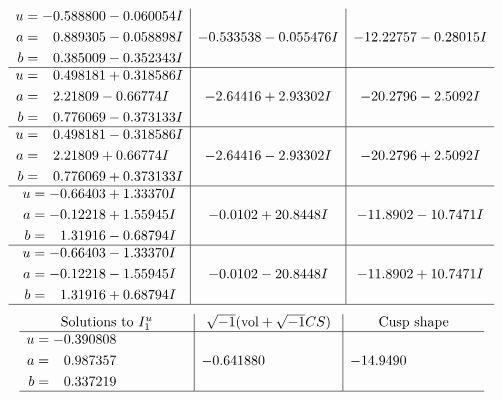 \documentclass[1p]{elsarticle_modified}
\theoremstyle{definition}
\newcommand{\I}{\sqrt{-1}}
\begin{document}
$$\begin{array}{c|c|c}
\begin{aligned}
u &= -0.588800 - 0.060054 I \\
a &= \phantom{-}0.889305 - 0.058898 I \\
b &= \phantom{-}0.385009 - 0.352343 I\end{aligned}
 & -0.533538 - 0.055476 I & -12.22757 - 0.28015 I \\ \hline\begin{aligned}
u &= \phantom{-}0.498181 + 0.318586 I \\
a &= \phantom{-}2.21809 - 0.66774 I \\
b &= \phantom{-}0.776069 - 0.373133 I\end{aligned}
 & -2.64416 + 2.93302 I & -20.2796 - 2.5092 I \\ \hline\begin{aligned}
u &= \phantom{-}0.498181 - 0.318586 I \\
a &= \phantom{-}2.21809 + 0.66774 I \\
b &= \phantom{-}0.776069 + 0.373133 I\end{aligned}
 & -2.64416 - 2.93302 I & -20.2796 + 2.5092 I \\ \hline\begin{aligned}
u &= -0.66403 + 1.33370 I \\
a &= -0.12218 + 1.55945 I \\
b &= \phantom{-}1.31916 - 0.68794 I\end{aligned}
 & -0.0102 + 20.8448 I & -11.8902 - 10.7471 I \\ \hline\begin{aligned}
u &= -0.66403 - 1.33370 I \\
a &= -0.12218 - 1.55945 I \\
b &= \phantom{-}1.31916 + 0.68794 I\end{aligned}
 & -0.0102 - 20.8448 I & -11.8902 + 10.7471 I\\
 \hline 
 \end{array}$$\newpage$$\begin{array}{c|c|c}  
\text{Solutions to }I^u_{1}& \I (\text{vol} + \sqrt{-1}CS) & \text{Cusp shape}\\
 \hline 
\begin{aligned}
u &= -0.390808\phantom{ +0.000000I} \\
a &= \phantom{-}0.987357\phantom{ +0.000000I} \\
b &= \phantom{-}0.337219\phantom{ +0.000000I}\end{aligned}
 & -0.641880\phantom{ +0.000000I} & -14.9490\phantom{ +0.000000I}\\
 \hline 
 \end{array}$$\newpage\newpage\renewcommand{\arraystretch}{1}
\end{document}
